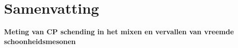 \chapter*{Samenvatting}
\chaptermark{}

{\Large\bf
  Meting van CP schending in het mixen en vervallen van vreemde schoonheidsmesonen
}
\vspace*{0.05\textwidth}

\noindent
